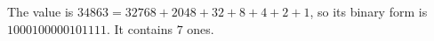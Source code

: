 The value is $ 34863=32768+2048+32+8+4+2+1 $, so its binary form is $ 1000100000101111 $. It contains $\boxed7 $ ones.
